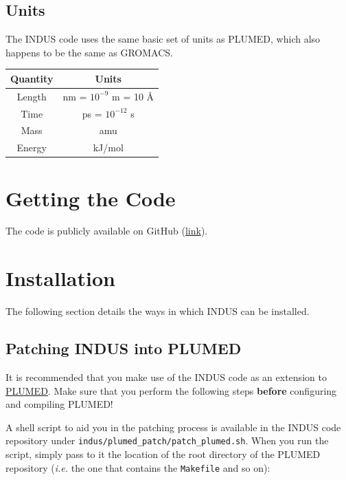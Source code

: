 \documentclass[11pt,notitlepage]{article}
\newcommand{\repo}[1][GitHub]{\href{https://github.com/seanmarks/indus}{#1}}
\newcommand{\PLUMED}{\href{http://www.plumed.org/}{PLUMED}}
\begin{document}

\subsection{Units}

The INDUS code uses the same basic set of units as PLUMED, which also happens to be the same as GROMACS.

\begin{center}
	\begin{tabular}{| c c |} 
		\hline
		\textbf{Quantity} & \textbf{Units} \\
		\hline
		Length & nm = $10^{-9}$ m = 10 \AA \\
		Time   & ps = $10^{-12}$ s \\
		Mass   & amu \\
		\hline
		Energy & kJ/mol \\
		\hline
	\end{tabular}
\end{center}


\section{Getting the Code}

The code is publicly available on GitHub (\repo[link]).


\section{Installation}

The following section details the ways in which INDUS can be installed.


\subsection{Patching INDUS into PLUMED}

It is recommended that you make use of the INDUS code as an extension to \PLUMED. Make sure that you perform the following steps \textbf{before} configuring and compiling PLUMED! 

A shell script to aid you in the patching process is available in the INDUS code repository under \texttt{indus/plumed\_patch/patch\_plumed.sh}. When you run the script, simply pass to it the location of the root directory of the PLUMED repository (\emph{i.e.} the one that contains the \texttt{Makefile} and so on):
\end{document}
